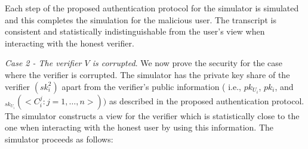\documentclass[journal]{IEEEtran}
\begin{document}
Each step of the proposed authentication protocol for the simulator is simulated and this completes the simulation for the malicious user. The transcript is consistent and statistically indistinguishable from the user's view when interacting with the honest verifier. 

{\it Case 2 - The verifier $V$ is corrupted}. We now prove the security for the case where the verifier is corrupted. The simulator has the private key share of the verifier $(sk_i^2)$ apart from the verifier's public information ( i.e., $pk_{U_i}$, $pk_i$, and $_{sk_{U_i}}(<C_i^j:j=1,\ldots,n>))$ as described in the proposed authentication protocol. The simulator constructs a view for the verifier which is statistically close to the one when interacting with the honest user by using this information. The simulator proceeds as follows:
\end{document}
